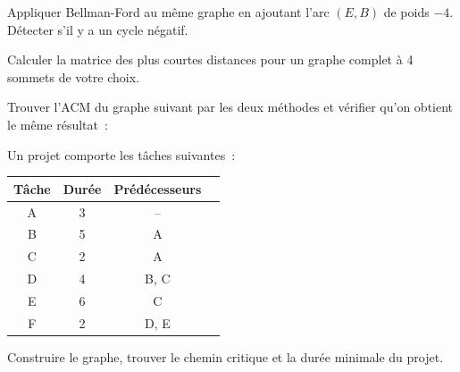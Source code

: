 \begin{exercice}
Appliquer Bellman-Ford au m\^eme graphe en ajoutant l'arc $(E, B)$ de poids
$-4$.  D\'etecter s'il y a un cycle n\'egatif.
\end{exercice}

\begin{exercice}
Calculer la matrice des plus courtes distances pour un graphe complet \`a 4
sommets de votre choix.
\end{exercice}

\begin{exercice}
Trouver l'ACM du graphe suivant par les deux m\'ethodes et v\'erifier qu'on
obtient le m\^eme r\'esultat~:
\begin{center}
\end{center}
\end{exercice}

\begin{exercice}
Un projet comporte les t\^aches suivantes~:
\begin{center}
\begin{tabular}{cccc}
  \toprule
  T\^ache & Dur\'ee & Pr\'ed\'ecesseurs \\
  \midrule
  A & 3 & -- \\
  B & 5 & A \\
  C & 2 & A \\
  D & 4 & B, C \\
  E & 6 & C \\
  F & 2 & D, E \\
  \bottomrule
\end{tabular}
\end{center}
Construire le graphe, trouver le chemin critique et la dur\'ee minimale du
projet.
\end{exercice}
